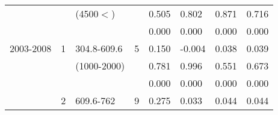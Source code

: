 \begin{table}[p]
\begin{tabular}{cclcllll}
                                                               &                                                                 & (4500$<$)                                                              &                                                                        & 0.505                                       & 0.802                                           & 0.871                                              & 0.716  \\ 
                                                               &                                                                 &                                                                                &                                                                        & 0.000                                       & 0.000                                           & 0.000                                              & 0.000  \\ \hline\noalign{\smallskip}
2003-2008                                              & 1                                                             & 304.8-609.6                                                            & 5                                                                     & 0.150                                       & -0.004                                          & 0.038                                              & 0.039  \\ 
                                                               &                                                                 & (1000-2000)                                                           &                                                                        & 0.781                                       & 0.996                                           & 0.551                                              & 0.673  \\  
                                                               &                                                                 &                                                                                &                                                                        & 0.000                                       & 0.000                                           & 0.000                                              & 0.000  \\ \cline{5-8}\noalign{\smallskip}
                                                               &  2                                                             & 609.6-762                                                              & 9                                                                     & 0.275                                       & 0.033                                           & 0.044                                              & 0.044  \\ 

\end{tabular}
\end{table}
